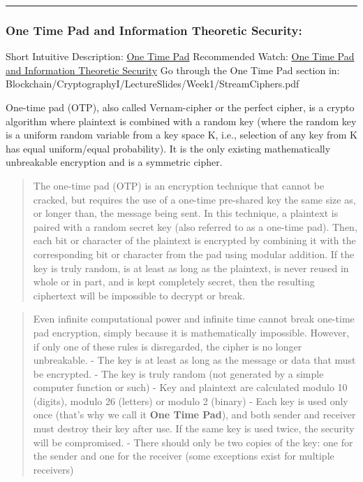 \documentclass[11pt]{article}
\begin{document}
\begin{center}\rule{0.5\linewidth}{\linethickness}\end{center}

    \hypertarget{one-time-pad-and-information-theoretic-security}{%
\subsubsection{One Time Pad and Information Theoretic
Security:}\label{one-time-pad-and-information-theoretic-security}}

Short Intuitive Description:
\href{https://www.khanacademy.org/computing/computer-science/cryptography/crypt/v/one-time-pad}{One
Time Pad} Recommended Watch:
\href{https://www.coursera.org/learn/crypto/lecture/cbnX1/information-theoretic-security-and-the-one-time-pad}{One
Time Pad and Information Theoretic Security} Go through the One Time Pad
section in:
Blockchain/CryptographyI/LectureSlides/Week1/StreamCiphers.pdf

One-time pad (OTP), also called Vernam-cipher or the perfect cipher, is
a crypto algorithm where plaintext is combined with a random key (where
the random key is a uniform random variable from a key space K, i.e.,
selection of any key from K has equal uniform/equal probability). It is
the only existing mathematically unbreakable encryption and is a
symmetric cipher.

\begin{quote}
The one-time pad (OTP) is an encryption technique that cannot be
cracked, but requires the use of a one-time pre-shared key the same size
as, or longer than, the message being sent. In this technique, a
plaintext is paired with a random secret key (also referred to as a
one-time pad). Then, each bit or character of the plaintext is encrypted
by combining it with the corresponding bit or character from the pad
using modular addition. If the key is truly random, is at least as long
as the plaintext, is never reused in whole or in part, and is kept
completely secret, then the resulting ciphertext will be impossible to
decrypt or break.
\end{quote}

\begin{quote}
Even infinite computational power and infinite time cannot break
one-time pad encryption, simply because it is mathematically impossible.
However, if only one of these rules is disregarded, the cipher is no
longer unbreakable. - The key is at least as long as the message or data
that must be encrypted. - The key is truly random (not generated by a
simple computer function or such) - Key and plaintext are calculated
modulo 10 (digits), modulo 26 (letters) or modulo 2 (binary) - Each key
is used only once (that's why we call it \textbf{One Time Pad}), and
both sender and receiver must destroy their key after use. If the same
key is used twice, the security will be compromised. - There should only
be two copies of the key: one for the sender and one for the receiver
(some exceptions exist for multiple receivers)
\end{quote}
\end{document}
